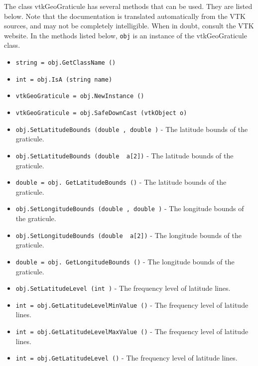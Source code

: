 The class vtkGeoGraticule has several methods that can be used.
  They are listed below.
Note that the documentation is translated automatically from the VTK sources,
and may not be completely intelligible.  When in doubt, consult the VTK website.
In the methods listed below, \verb|obj| is an instance of the vtkGeoGraticule class.
\begin{itemize}
\item  \verb|string = obj.GetClassName ()|

\item  \verb|int = obj.IsA (string name)|

\item  \verb|vtkGeoGraticule = obj.NewInstance ()|

\item  \verb|vtkGeoGraticule = obj.SafeDownCast (vtkObject o)|

\item  \verb|obj.SetLatitudeBounds (double , double )| -  The latitude bounds of the graticule.

\item  \verb|obj.SetLatitudeBounds (double  a[2])| -  The latitude bounds of the graticule.

\item  \verb|double = obj. GetLatitudeBounds ()| -  The latitude bounds of the graticule.

\item  \verb|obj.SetLongitudeBounds (double , double )| -  The longitude bounds of the graticule.

\item  \verb|obj.SetLongitudeBounds (double  a[2])| -  The longitude bounds of the graticule.

\item  \verb|double = obj. GetLongitudeBounds ()| -  The longitude bounds of the graticule.

\item  \verb|obj.SetLatitudeLevel (int )| -  The frequency level of latitude lines.

\item  \verb|int = obj.GetLatitudeLevelMinValue ()| -  The frequency level of latitude lines.

\item  \verb|int = obj.GetLatitudeLevelMaxValue ()| -  The frequency level of latitude lines.

\item  \verb|int = obj.GetLatitudeLevel ()| -  The frequency level of latitude lines.


\end{itemize}
